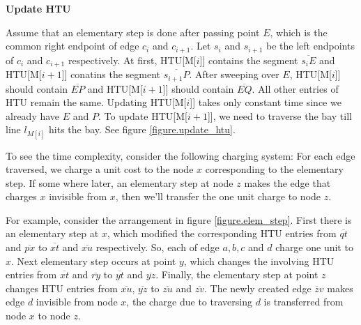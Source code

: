\documentclass[12pt]{article}
\begin{document}
        \vspace{.2 cm}

        {\bf Update HTU}

        \vspace{.2 cm}

        Assume that an elementary step is done after passing point $E$, which
        is the common right endpoint of edge $c_{i}$ and $c_{i+1}$. Let
        $s_{i}$ and $s_{i+1}$ be the left endpoints of $c_{i}$ and $c_{i+1}$
        respectively. At first, HTU[M[$i$]] contains the segment ${\overline{ 
        s_{i}E}}$ and HTU[M[$i+1$]] conatins the segment
        ${\overline{s_{i+1}P}}$.
        After sweeping over $E$, HTU[M[$i$]] should contain ${\overline{EP}}$
        and HTU[M[$i+1$]] should contain ${\overline{EQ}}$. All other entries
        of HTU remain the same.  Updating HTU[M[$i$]] takes only constant time
        since we already have $E$ and $P$. To update HTU[M[$i+1$]], we need to
        traverse the bay till line $l_{M[i]}$ hits the bay.  See figure \ref{figure.update_htu}.

        To see the time complexity, consider the following charging system:
        For each edge traversed, we charge a unit cost to the node $x$
        corresponding to the elementary step. If some where later, an
        elementary step at node $z$ makes the edge that charges $x$ invisible
        from $x$, then we'll transfer the one unit charge to node $z$.

        \newpage

        For example, consider the arrangement in figure \ref{figure.elem_step}. First there
        is an elementary step at $x$, which modified the corresponding HTU
        entries from ${\overline{qt}}$ and ${\overline{px}}$ to ${\overline{xt}}$
        and ${\overline{xu}}$ respectively. So, each of edge $a,b,c$ and $d$
        charge one unit to $x$. Next elementary step occurs at point $y$,
        which changes the involving HTU entries from ${\overline{xt}}$ and
        ${\overline{ry}}$ to ${\overline{yt}}$ and ${\overline{yz}}$.  Finally,
        the elementary step at point $z$ changes HTU entries from ${\overline{
        xu}}$, ${\overline{yz}}$ to ${\overline{zu}}$ and ${\overline{zv}}$. The
        newly created edge ${\overline zv}$ makes edge $d$ invisible from node
        $x$, the charge due to traversing $d$ is transferred from node $x$ to
        node $z$.  %
\end{document}

